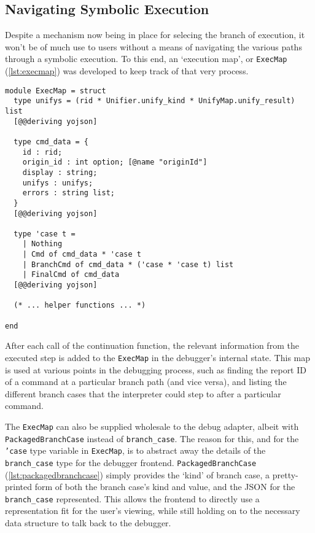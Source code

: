 \subsection{Navigating Symbolic Execution}

Despite a mechanism now being in place for selecing the branch of execution, it
won't be of much use to users without a means of navigating the various paths
through a symbolic execution. To this end, an `execution map', or
\texttt{ExecMap} (\autoref{lst:execmap}) was developed to keep track of that
very process.

\begin{lstlisting}[caption={
  The \texttt{ExecMap} module, inside the \texttt{Debugger} module
  \label{lst:execmap}}, style=code, numbers=none]
module ExecMap = struct
  type unifys = (rid * Unifier.unify_kind * UnifyMap.unify_result) list
  [@@deriving yojson]

  type cmd_data = {
    id : rid;
    origin_id : int option; [@name "originId"]
    display : string;
    unifys : unifys;
    errors : string list;
  }
  [@@deriving yojson]

  type 'case t =
    | Nothing
    | Cmd of cmd_data * 'case t
    | BranchCmd of cmd_data * ('case * 'case t) list
    | FinalCmd of cmd_data
  [@@deriving yojson]

  (* ... helper functions ... *)

end
\end{lstlisting}

After each call of the continuation function, the relevant information from
the executed step is added to the \texttt{ExecMap} in the debugger's internal
state. This map is used at various points in the debugging process, such as
finding the report ID of a command at a particular branch path (and vice versa),
and listing the different branch cases that the interpreter could step to after
a particular command.

The \texttt{ExecMap} can also be supplied wholesale to the debug adapter,
albeit with \texttt{PackagedBranchCase} instead of \texttt{branch\_case}.
The reason for this, and for the \texttt{'case} type variable in
\texttt{ExecMap}, is to abstract away the details of the \texttt{branch\_case}
type for the debugger frontend. \texttt{PackagedBranchCase}
(\autoref{lst:packagedbranchcase}) simply provides the `kind' of branch case,
a pretty-printed form of both the branch case's kind and value, and the JSON
for the \texttt{branch\_case} represented. This allows the frontend to directly
use a representation fit for the user's viewing, while still holding on to the
necessary data structure to talk back to the debugger.

